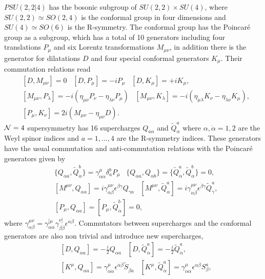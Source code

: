 $PSU(2,2|4)$ has the bosonic subgroup of $SU(2,2) \times SU(4)$, where $SU(2,2) \simeq SO(2,4)$ is the conformal group in four dimensions and $SU(4) \simeq SO(6)$ is the R-symmetry. 
The conformal group has the Poincar\'{e} group as a subgroup, which has a total of 10 generators including four translations $P_\mu$ and six Lorentz transformations $M_{\mu\nu}$, in addition there is the generator for dilatations $D$ and four special conformal generators $K_\mu$. 
Their commutation relations read
\begin{eqnarray}
 &[D, M_{\mu\nu}] = 0 \; \; \; [D, P_\mu] = -i P_\mu \; \; \; [D, K_\mu] = +i K_\mu,  \nonumber\\
 &[M_{\mu\nu}, P_\lambda] = -i(\eta_{\mu\nu} P_\nu - \eta_{\lambda\nu} P_\mu) \; \; \; [M_{\mu\nu}, K_\lambda] = -i(\eta_{\mu\lambda} K_\nu - \eta_{\lambda\nu} K_\mu),  \nonumber\\
 &[P_\mu, K_\nu] = 2i(M_{\mu\nu} - \eta_{\mu\nu} D).
 \label{eq:conformal_group}
\end{eqnarray}
$\mathcal{N}=4$ supersymmetry has 16 supercharges $Q_{a\alpha}$ and $\tilde{Q}^a_{\dot{\alpha}}$ where $\alpha, \dot{\alpha} = 1, 2$ are the Weyl spinor indices and $a = 1,...,4$ are the R-symmetry indices. 
These generators have the usual commutation and anti-commutation relations with the Poincar\'{e} generators given by 
\begin{eqnarray}
	& \{Q_{\alpha a}, \tilde{Q}^b_{\dot{\alpha}}\} = \gamma^\mu_{\alpha\dot{\alpha}} \delta_a^b P_\mu \; \; \; \{Q_{\alpha a}, Q_{\alpha b}\} = \{ \tilde{Q}^a_{\dot{\alpha}}, \tilde{Q}^b_{\dot{\alpha}} \} = 0, \nonumber\\
	& [M^{\mu\nu}, Q_{\alpha a}] = i \gamma^{\mu\nu}_{\alpha\beta} \epsilon^{\beta\gamma} Q_{\gamma a} \; \; \; [M^{\mu\nu}, \tilde{Q}^a_{\dot{\alpha}}] = i \gamma^{\mu\nu}_{\dot{\alpha}\dot{\beta}} \epsilon^{\dot{\beta}\dot{\gamma}} \tilde{Q}_{\dot{\gamma}}^a, \nonumber \\
	& [P_\mu, Q_{\alpha a}] = [P_\mu, \tilde{Q}^b_{\dot{\alpha}}] = 0,
\end{eqnarray} 
where $\gamma_{\alpha\beta}^{\mu\nu} = \gamma^{[\mu}_{\alpha\dot{\alpha}} \gamma^{\nu]}_{\beta\dot{\beta}} \epsilon^{\dot{\alpha}\dot{\beta}}$. 
Commutators between supercharges and the conformal generators are also non trivial and introduce new supercharges,
\begin{eqnarray}
	& [D, Q_{\alpha a}] = -\frac{i}{2} Q_{\alpha a} \; \; \; [D, \tilde{Q}_{\dot{\alpha}}^a] = -\frac{i}{2} \tilde{Q}_{\dot{\alpha}}^a, \nonumber \\
	& [K^\mu,  Q_{\alpha a}] = \gamma^\mu_{\alpha\dot{\alpha}} \epsilon^{\dot{\alpha} \dot{\beta}} \tilde{S}_{\dot{\beta} a} \; \; \; [K^\mu, \tilde{Q}_{\dot{\alpha}}^a] = \gamma^\mu_{\alpha\dot{\alpha}} \epsilon^{\alpha\beta} S_\beta^a,
	\label{eq:dq_commutators}
\end{eqnarray}
